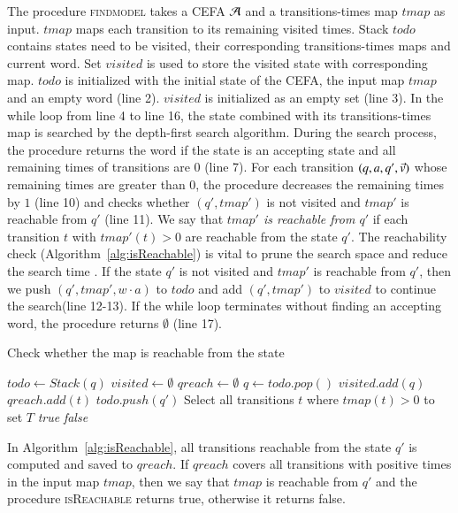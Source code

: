   The procedure \textsc{findmodel} takes a CEFA $\mathcal{A}$ and a transitions-times map $tmap$ as input. $tmap$ maps each transition to its remaining visited times. Stack $todo$ contains states need to be visited, their corresponding transitions-times maps and current word. Set $visited$ is used to store the visited state with corresponding map. $todo$ is initialized with the initial state of the CEFA, the input map $tmap$ and an empty word (line 2). $visited$ is initialized as an empty set (line 3).
  In the while loop from line 4 to line 16, the state combined with its transitions-times map is searched by the depth-first search algorithm. During the search process, the procedure returns the word if the state is an accepting state and all remaining times of transitions are $0$ (line 7). For each transition $(q, a, q', \vec{v})$ whose remaining times are greater than $0$, the procedure decreases the remaining times by $1$ (line 10) and checks whether $(q', tmap')$ is not visited and $tmap'$ is reachable from $q'$ (line 11). We say that \textit{$tmap'$ is reachable from $q'$} if each transition $t$ with $tmap'(t)> 0$ are reachable from the state $q'$. The reachability check (Algorithm~\ref{alg:isReachable}) is vital to prune the search space and reduce the search time . If the state $q'$ is not visited and $tmap'$ is reachable from $q'$, then we push $(q', tmap', w\cdot a)$ to $todo$ and add $(q', tmap')$ to $visited$ to continue the search(line 12-13). If the while loop terminates without finding an accepting word, the procedure returns $\emptyset$ (line 17).  
  
  \begin{algorithm}[H]
    \caption{Check whether the map is reachable from the state}\label{alg:isReachable}
    \begin{algorithmic}[1]
      \State $todo \gets Stack(q)$
      \State $visited \gets \emptyset$
      \State $qreach \gets \emptyset$
        \State $q \gets todo.pop()$
        \State $visited.add(q)$
          \State $qreach.add(t)$
            \State $todo.push(q')$
          \EndIf
        \EndFor
      \EndWhile
      \State Select all transitions $t$ where $tmap(t)>0$ to set $T$
        \State \Return \textit{true}  
      \Else 
        \State \Return \textit{false}
      \EndIf
      \EndProcedure
    \end{algorithmic}
  \end{algorithm}

  In Algorithm~\ref{alg:isReachable}, all transitions reachable from the state $q'$ is computed and saved to $qreach$. If $qreach$ covers all transitions with positive times in the input map $tmap$, then we say that $tmap$ is reachable from $q'$ and the procedure \textsc{isReachable} returns true, otherwise it returns false.  